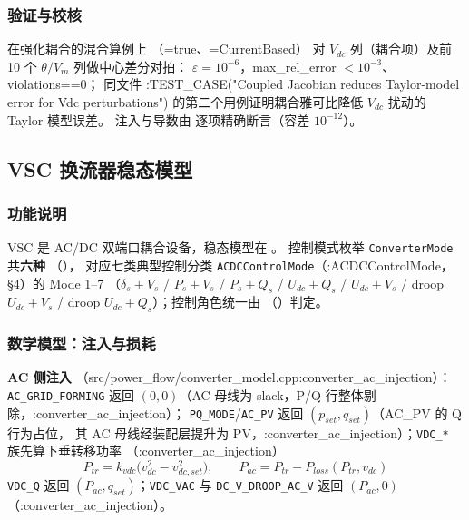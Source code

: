 \subsubsection*{验证与校核}
 在强化耦合的混合算例上
（=true、=CurrentBased）
对 $V_{dc}$ 列（耦合项）及前 10 个 $\theta/V_m$ 列做中心差分对拍：
$\varepsilon=10^{-6}$，max\_rel\_error $<10^{-3}$、violations==0；
同文件 :TEST\_CASE("Coupled Jacobian reduces Taylor-model error for Vdc perturbations") 的第二个用例证明耦合雅可比降低 $V_{dc}$ 扰动的 Taylor 模型误差。
 注入与导数由 
逐项精确断言（容差 $10^{-12}$）。

\subsection{VSC 换流器稳态模型}\label{sec:hybrid-vsc}


\subsubsection*{功能说明}
VSC 是 AC/DC 双端口耦合设备，稳态模型在 。
控制模式枚举 \texttt{ConverterMode} 共\textbf{六种}
（），
对应七类典型控制分类 \texttt{ACDCControlMode}（:ACDCControlMode，
 §4）的 Mode 1--7
（$\delta_s{+}V_s$ / $P_s{+}V_s$ / $P_s{+}Q_s$ / $U_{dc}{+}Q_s$ / $U_{dc}{+}V_s$ /
droop $U_{dc}{+}V_s$ / droop $U_{dc}{+}Q_s$）；控制角色统一由
（）判定。

\subsubsection*{数学模型：注入与损耗}
\textbf{AC 侧注入} （src/power\_flow/converter\_model.cpp:converter\_ac\_injection）：
\texttt{AC\_GRID\_FORMING} 返回 $(0,0)$（AC 母线为 slack，P/Q 行整体剔除，:converter\_ac\_injection）；
\texttt{PQ\_MODE}/\texttt{AC\_PV} 返回 $(p_{set},q_{set})$（AC\_PV 的 Q 行为占位，
其 AC 母线经装配层提升为 PV，:converter\_ac\_injection）；\texttt{VDC\_*} 族先算下垂转移功率
（:converter\_ac\_injection）
\[
P_{tr}=k_{vdc}\big(v_{dc}^{2}-v_{dc,set}^{2}\big),\qquad P_{ac}=P_{tr}-P_{loss}(P_{tr},v_{dc})
\]
\texttt{VDC\_Q} 返回 $(P_{ac},q_{set})$；\texttt{VDC\_VAC} 与
\texttt{DC\_V\_DROOP\_AC\_V} 返回 $(P_{ac},0)$（:converter\_ac\_injection）。

